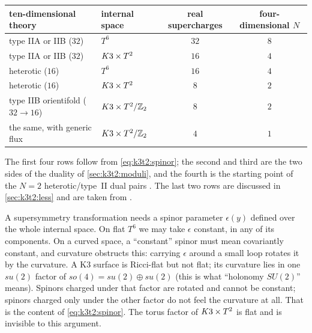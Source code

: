 \begin{center}
\begin{tabular}{@{}llcc@{}}
\toprule
ten-dimensional theory & internal space & real supercharges & four-dimensional $N$\\
\midrule
type IIA or IIB ($32$) & $T^6$ & $32$ & $8$\\
type IIA or IIB ($32$) & $K3\times T^2$ & $16$ & $4$\\
heterotic ($16$) & $T^6$ & $16$ & $4$\\
heterotic ($16$) & $K3\times T^2$ & $8$ & $2$\\
type IIB orientifold ($32\to16$) & $K3\times T^2/\mathbb{Z}_2$ & $8$ & $2$\\
the same, with generic flux & $K3\times T^2/\mathbb{Z}_2$ & $4$ & $1$\\
\bottomrule
\end{tabular}
\end{center}
The first four rows follow from \eqref{eq:k3t2:spinor}; the second and third are the two
sides of the duality of \cref{sec:k3t2:moduli}, and the fourth is the starting point of the
$N=2$ heterotic/type~II dual pairs . The last two rows are
discussed in \cref{sec:k3t2:less} and are taken from .

\begin{physicsbox}
A supersymmetry transformation needs a spinor parameter $\epsilon(y)$ defined over the whole
internal space. On flat $T^6$ we may take $\epsilon$ constant, in any of its components. On
a curved space, a ``constant'' spinor must mean covariantly constant, and curvature obstructs
this: carrying $\epsilon$ around a small loop rotates it by the curvature. A K3 surface is
Ricci-flat but not flat; its curvature lies in one $su(2)$ factor of $so(4)=su(2)\oplus su(2)$
(this is what ``holonomy $SU(2)$'' means). Spinors charged under that factor are rotated and
cannot be constant; spinors charged only under the other factor do not feel the curvature at
all. That is the content of \eqref{eq:k3t2:spinor}. The torus factor of $K3\times T^2$ is flat and is
invisible to this argument.
\end{physicsbox}

